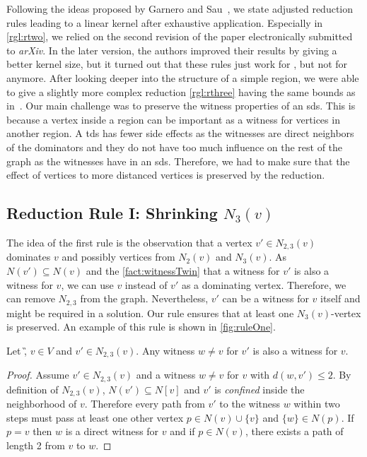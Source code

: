 Following the ideas proposed by Garnero and Sau~\cite[arXiv v2]{Garnero2018}, we state adjusted reduction rules leading to a linear kernel after exhaustive application. 
Especially in \cref{rgl:rtwo}, we relied on the second revision of the paper electronically submitted to \textit{arXiv}.
In the later version, the authors improved their results by giving a better kernel size, but it turned out that these rules just work for \tdom, but not for \sdom anymore.
After looking deeper into the structure of a simple region, we were able to give a slightly more complex reduction \cref{rgl:rthree} having the same bounds as in~\cite{Garnero2018}.  
Our main challenge was to preserve the witness properties of an sds.
This is because a vertex inside a region can be important as a witness for vertices in another region. 
A tds has fewer side effects as the witnesses are direct neighbors of the dominators and they do not have too much influence on the rest of the graph as the witnesses have in an sds.
Therefore, we had to make sure that the effect of vertices to more distanced vertices is preserved by the reduction.

\subsection{Reduction Rule I: Shrinking $N_3(v)$}


The idea of the first rule is the observation that a vertex $v' \in N_{2,3}(v)$ dominates $v$ and possibly vertices from $N_2(v)$ and $N_3(v)$. As $N(v') \subseteq N(v)$ and the \cref{fact:witnessTwin} that a witness for $v'$ is also a witness for $v$, we can use $v$ instead of $v'$ as a dominating vertex. Therefore, we can remove $N_{2,3}$ from the graph. Nevertheless, $v'$ can be a witness for $v$ itself and might be required in a solution. Our rule ensures that at least one $N_3(v)$-vertex is preserved. An example of this rule is shown in \cref{fig:ruleOne}.

\begin{fact}\label{fact:witnessTwin}
Let \G, $v \in V$ and $v' \in N_{2,3}(v)$. Any witness $w \neq v$ for $v'$ is also a witness for $v$. %
\end{fact}
\begin{proof}

Assume $v' \in N_{2,3}(v)$ and a witness $w \neq v$ for $v$ with $d(w,v') \leq 2$. 
By definition of $N_{2,3}(v)$, $N(v') \subseteq N[v]$ and $v'$ is \textit{confined} inside the neighborhood of $v$. 
Therefore every path from $v'$ to the witness $w$ within two steps must pass at least one other vertex $p \in N(v) \cup \{v\}$ and $\{w\} \in N(p)$.
If $p = v$ then $w$ is a direct witness for $v$ and if $p \in N(v)$, there exists a path of length 2 from $v$ to $w$.
\end{proof}

